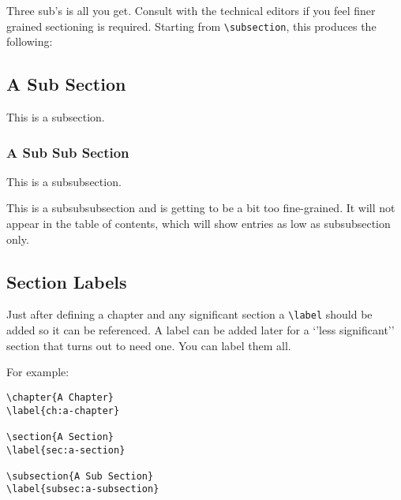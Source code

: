Three sub's is all you get.  
Consult with the technical editors if you feel finer grained
sectioning is required.
Starting from \verb|\subsection|, this produces the following:

\subsection{A Sub Section}

This is a subsection.

\subsubsection{A Sub Sub Section}

This is a subsubsection.


This is a subsubsubsection and is getting to be a bit too fine-grained. It will not appear in 
the table of contents, which will show entries as low as subsubsection only.

\subsection{Section Labels}

Just after defining a chapter and any significant section a
\verb|\label| should be added so it can be referenced.
A label can be added later for a `'less significant'' section that
turns out to need one. You can label them all. 

For example:

\begin{verbatim}
\chapter{A Chapter}
\label{ch:a-chapter}

\section{A Section}
\label{sec:a-section}

\subsection{A Sub Section}
\label{subsec:a-subsection}
\end{verbatim}

